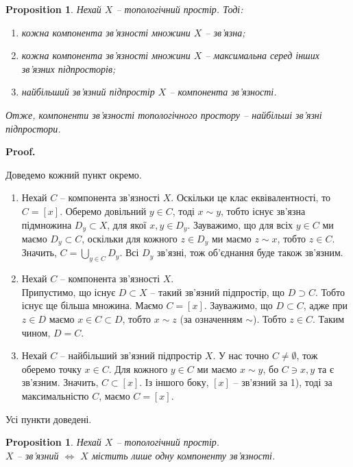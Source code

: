 \documentclass[a4paper, 10pt]{article}
\makeatletter
\theoremstyle{theoremdd}
\newtheorem{proposition}[theorem]{Proposition}
\renewenvironment{proof}[1][Proof.\\]{\par
\pushQED{\hfill \qed}%
\normalfont \topsep6\p@\@plus6\p@\relax
\trivlist
\item\relax
{\bfseries
#1\@addpunct{.}}\hspace\labelsep\ignorespaces
}{%
\popQED\endtrivlist\@endpefalse
}
\makeatother
\begin{document}
\begin{proposition}
Нехай $X$ -- топологічний простір. Тоді:
\begin{enumerate}[nosep, wide=0pt, label={\arabic*)}]
\item кожна компонента зв'язності множини $X$ -- зв'язна;
\item кожна компонента зв'язності множини $X$ -- максимальна серед інших зв'язних підпросторів;
\item найбільший зв'язний підпростір $X$ -- компонента зв'язності.
\end{enumerate}
Отже, компоненти зв'язності топологічного простору -- найбільші зв'язні підпростори.
\end{proposition}

\begin{proof}
Доведемо кожний пункт окремо.
\begin{enumerate}[wide=0pt, label={\arabic*)}]
\item Нехай $C$ -- компонента зв'язності $X$. Оскільки це клас еквівалентності, то $C = [x]$. Оберемо довільний $y \in C$, тоді $x \sim y$, тобто існує зв'язна підмножина $D_y \subset X$, для якої $x,y \in D_y$. Зауважимо, що для всіх $y \in C$ ми маємо $D_y \subset C$, оскільки для кожного $z \in D_y$ ми маємо $z \sim x$, тобто $z \in C$. Значить, $C = \displaystyle\bigcup_{y \in C} D_y$. Всі $D_y$ зв'язні, тож об'єднання буде також зв'язним.

\item Нехай $C$ -- компонента зв'язності $X$. \\
Припустимо, що існує $D \subset X$ -- такий зв'язний підпростір, що $D \supset C$. Тобто існує ще більша множина. Маємо $C = [x]$. Зауважимо, що $D \subset C$, адже при $z \in D$ маємо $x \in C \subset D$, тобто $x \sim z$ (за означенням $\sim$). Тобто $z \in C$. Таким чином, $D = C$.

\item Нехай $C$ -- найбільший зв'язний підпростір $X$. У нас точно $C \neq \emptyset$, тож оберемо точку $x \in C$. Для кожного $y \in C$ ми маємо $x \sim y$, бо $C \ni x,y$ та є зв'язним. Значить, $C \subset [x]$. Із іншого боку, $[x]$ -- зв'язний за 1), тоді за максимальністю $C$, маємо $C = [x]$.
\end{enumerate}
Усі пункти доведені.
\end{proof}

\begin{proposition}
Нехай $X$ -- топологічний простір.\\
$X$ -- зв'язний $\iff$ $X$ містить лише одну компоненту зв'язності.
\end{proposition}
\end{document}
